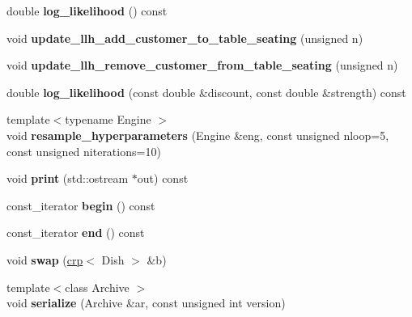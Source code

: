 \begin{DoxyCompactItemize}
double {\bfseries log\+\_\+likelihood} () const
\item 
\mbox{\label{classcpyp_1_1crp_a823e0d14da86862e454d54220b3543e0}} 
void {\bfseries update\+\_\+llh\+\_\+add\+\_\+customer\+\_\+to\+\_\+table\+\_\+seating} (unsigned n)
\item 
\mbox{\label{classcpyp_1_1crp_a5b79e1b462091556fdf0bb452cc42efe}} 
void {\bfseries update\+\_\+llh\+\_\+remove\+\_\+customer\+\_\+from\+\_\+table\+\_\+seating} (unsigned n)
\item 
\mbox{\label{classcpyp_1_1crp_a6dd7c2621397ccb432f0cdc216d6d134}} 
double {\bfseries log\+\_\+likelihood} (const double \&discount, const double \&strength) const
\item 
\mbox{\label{classcpyp_1_1crp_a07b83d3107d378a9a50cd9daa79852c6}} 
{\footnotesize template$<$typename Engine $>$ }\\void {\bfseries resample\+\_\+hyperparameters} (Engine \&eng, const unsigned nloop=5, const unsigned niterations=10)
\item 
\mbox{\label{classcpyp_1_1crp_ac4db7e8ee422389cfc52903af3e56110}} 
void {\bfseries print} (std\+::ostream $\ast$out) const
\item 
\mbox{\label{classcpyp_1_1crp_af875ce6a92cf4be77fc48d9dfb23164d}} 
const\+\_\+iterator {\bfseries begin} () const
\item 
\mbox{\label{classcpyp_1_1crp_af5af766b44c51d8c5e1568b082e54350}} 
const\+\_\+iterator {\bfseries end} () const
\item 
\mbox{\label{classcpyp_1_1crp_ad2b1052e99073bc910c7c96faa3c51da}} 
void {\bfseries swap} (\mbox{\hyperlink{classcpyp_1_1crp}{crp}}$<$ Dish $>$ \&b)
\item 
\mbox{\label{classcpyp_1_1crp_ad04cf89d7c725097c57fa3c80c223746}} 
{\footnotesize template$<$class Archive $>$ }\\void {\bfseries serialize} (Archive \&ar, const unsigned int version)
\end{DoxyCompactItemize}

